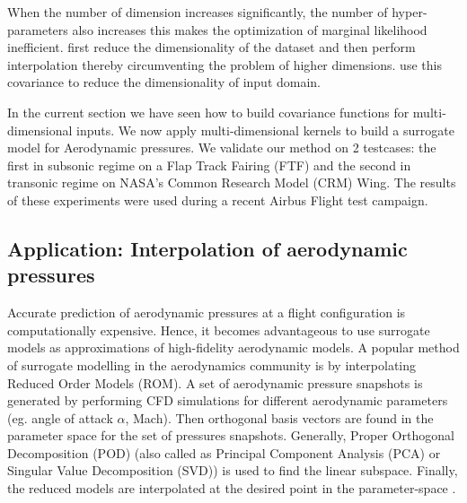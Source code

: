 When the number of dimension increases significantly, the number of hyper-parameters also increases this makes the optimization of marginal likelihood inefficient. \cite{bouhlel2016optimisation} first reduce the dimensionality of the dataset and then perform interpolation thereby circumventing the problem of higher dimensions. \cite{garnett2013active, tripathy2016gaussian} use this covariance to reduce the dimensionality of input domain.

In the current section we have seen how to build covariance functions for multi-dimensional inputs. We now apply multi-dimensional kernels to build a surrogate model for Aerodynamic pressures. We validate our method on 2 testcases: the first in subsonic regime on a Flap Track Fairing (FTF) and the second in transonic regime on NASA's Common Research Model (CRM) Wing. The results of these experiments were used during a recent Airbus Flight test campaign.

\subsection{Application: Interpolation of aerodynamic pressures}\label{subecInterpolationOfAerodynamicPressures}
Accurate prediction of aerodynamic pressures at a flight configuration is computationally expensive. Hence, it becomes advantageous to use surrogate models as approximations of high-fidelity aerodynamic models. A popular method of surrogate modelling in the aerodynamics community is by interpolating Reduced Order Models (ROM). A set of aerodynamic pressure snapshots is generated by performing CFD simulations for different aerodynamic parameters (eg. angle of attack $\alpha$, Mach). Then orthogonal basis vectors are found in the parameter space for the set of pressures snapshots. Generally, Proper Orthogonal Decomposition (POD) \cite{tan2003proper, rosenbaum2013efficient, braconnier2011towards} (also called as Principal Component Analysis (PCA) or Singular Value Decomposition (SVD)) is used to find the linear subspace. Finally, the reduced models are interpolated at the desired point in the parameter-space \cite{beckert2001multivariate, barrault2004empirical}. 


